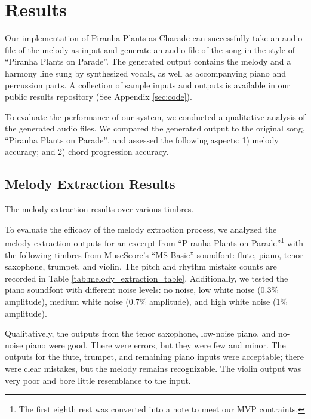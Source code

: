 \section{Results}
\label{sec:results}

Our implementation of Piranha Plants as Charade can successfully take an audio file of the melody as input and generate an audio file of the song in the style of ``Piranha Plants on Parade''. The generated output contains the melody and a harmony line sung by synthesized vocals, as well as accompanying piano and percussion parts. A collection of sample inputs and outputs is available in our public results repository (See Appendix \ref{sec:code}).

To evaluate the performance of our system, we conducted a qualitative analysis of the generated audio files. We compared the generated output to the original song, ``Piranha Plants on Parade'', and assessed the following aspects: 1) melody accuracy; and 2) chord progression accuracy.

\subsection{Melody Extraction Results}
\label{sec:melody_extraction_results}

\begin{table} %
	\caption{The melody extraction results over various timbres.}
	\centering
	
	\label{tab:melody_extraction_table}
\end{table}
To evaluate the efficacy of the melody extraction process, we analyzed the melody extraction outputs for an excerpt from ``Piranha Plants on Parade''\footnote{The first eighth rest was converted into a note to meet our MVP contraints.} with the following timbres from MuseScore's ``MS Basic'' soundfont: flute, piano, tenor saxophone, trumpet, and violin. The pitch and rhythm mistake counts are recorded in Table \ref{tab:melody_extraction_table}. Additionally, we tested the piano soundfont with different noise levels: no noise, low white noise (0.3\% amplitude), medium white noise (0.7\% amplitude), and high white noise (1\% amplitude).

Qualitatively, the outputs from the tenor saxophone, low-noise piano, and no-noise piano were good. There were errors, but they were few and minor. The outputs for the flute, trumpet, and remaining piano inputs were acceptable; there were clear mistakes, but the melody remains recognizable. The violin output was very poor and bore little resemblance to the input.

